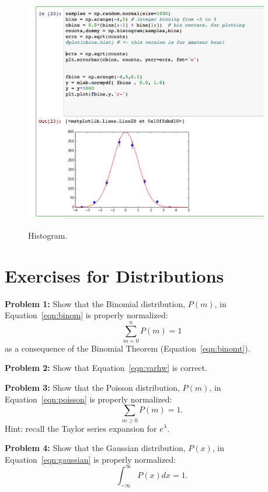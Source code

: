 \documentclass[12pt]{article}
\begin{document}
\begin{figure}[htbp]
\begin{center}
{\includegraphics[width=0.95\textwidth]{figs/scipy_hist.png}}
\end{center}
\caption{\label{fig:sphist} Histogram.}
\end{figure}

\newpage
\section{Exercises for Distributions}

\noindent
{\bf Problem 1:} Show that the Binomial distribution, $P(m)$, in Equation~\ref{eqn:binom} is properly normalized:
\begin{displaymath}
\sum_{m=0}^n P(m) = 1
\end{displaymath}
as a consequence of the Binomial Theorem (Equation~\ref{eqn:binomt}).

\vskip 1cm
\noindent
{\bf Problem 2:} Show that Equation~\ref{eqn:varhw} is correct.

\vskip 1cm
\noindent
{\bf Problem 3:} Show that the Poisson distribution, $P(m)$, in Equation~\ref{eqn:poisson} is properly normalized:
\begin{displaymath}
\sum_{m \geq 0} P(m) = 1.
\end{displaymath}
Hint: recall the Taylor series expansion for $e^\lambda$.

\vskip 1cm
\noindent
{\bf Problem 4:} Show that the Gaussian distribution, $P(x)$, in Equation~\ref{eqn:gaussian} is properly normalized:
\begin{displaymath}
\int_{-\infty}^{\infty} P(x) dx = 1.
\end{displaymath}
\end{document}
